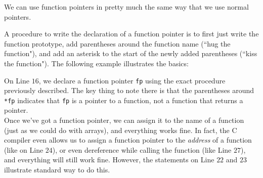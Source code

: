 We can use function pointers in pretty much the same way that we use normal pointers. 

A procedure to write the declaration of a function pointer is to first just write the function prototype, add parentheses around the function name (``hug the function"), and add an asterisk  to the start of the newly added parentheses (``kiss the function"). The following example illustrates the basics:


\lstset{
caption=Introduction to Function Pointers}
\begin{center}
\label{Introduction to Function Pointers}
\end{center}


On Line $16$, we declare a function pointer \verb!fp! using the exact procedure previously described. The key thing to note there is that the parentheses around \verb!*fp! indicates that \verb!fp! is a pointer to a function, not a function that returns a pointer. \\

Once we've got a function pointer, we can assign it to the name of a function (just as we could do with arrays), and everything works fine. In fact, the C compiler even allows us to assign a function pointer to the \textit{address} of a function (like on Line $24$), or even dereference while calling the function (like Line $27$), and everything will still work fine. However, the statements on Line $22$ and $23$ illustrate standard way to do this. \\





